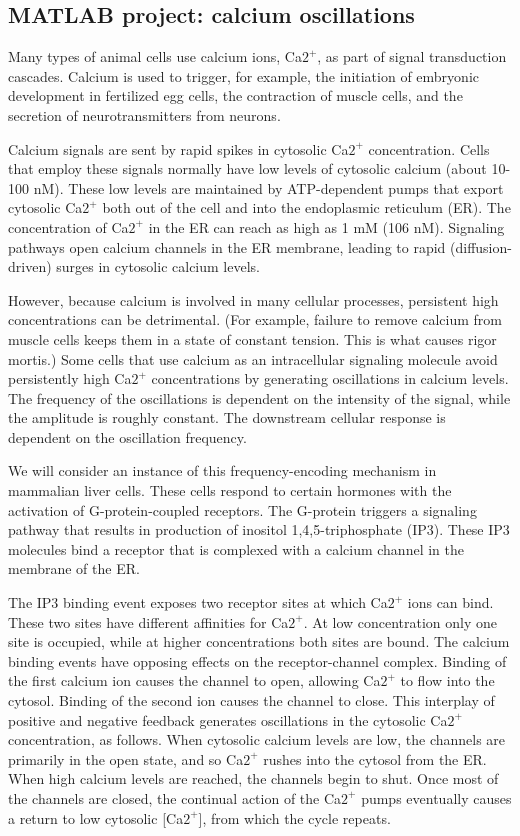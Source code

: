 \documentclass[12pt]{article}
\newcommand{\ans}[1]{

{\bf ANSWER:} #1\medskip}
\renewcommand{\ans}[1]{}
\begin{document}
\subsection*{MATLAB project: calcium oscillations}

\ans{VERSION WITH ANSWERS}

Many types of animal cells use calcium ions, Ca$2^+$, as part of signal
transduction cascades. Calcium is used to trigger, for example, the initiation
of embryonic development in fertilized egg cells, the contraction of muscle
cells, and the secretion of neurotransmitters from neurons.

Calcium signals are sent by rapid spikes in cytosolic Ca$2^+$ concentration.
Cells that employ these signals normally have low levels of cytosolic calcium
(about 10-100 nM). These low levels are maintained by ATP-dependent pumps that
export cytosolic Ca$2^+$ both out of the cell and into the endoplasmic
reticulum (ER). The concentration of Ca$2^+$ in the ER can reach as high as 1
mM (106 nM). Signaling pathways open calcium channels in the ER membrane,
leading to rapid (diffusion-driven) surges in cytosolic calcium levels.

However, because calcium is involved in many cellular processes, persistent
high concentrations can be detrimental. (For example, failure to remove
calcium from muscle cells keeps them in a state of constant tension.  This is
what causes rigor mortis.) Some cells that use calcium as an intracellular
signaling molecule avoid persistently high Ca$2^+$ concentrations by generating
oscillations in calcium levels. The frequency of the oscillations is dependent
on the intensity of the signal, while the amplitude is roughly constant. The
downstream cellular response is dependent on the oscillation frequency.

We will consider an instance of this frequency-encoding mechanism in mammalian
liver cells.  These cells respond to certain hormones with the activation of
G-protein-coupled receptors. The G-protein triggers a
signaling pathway that results in production of inositol 1,4,5-triphosphate
(IP3). These IP3 molecules bind a receptor that is complexed with a calcium
channel in the membrane of the ER.

The IP3 binding event exposes two receptor sites at which Ca$2^+$ ions can
bind.  These two sites have different affinities for Ca$2^+$.  At low 
concentration only one site is occupied, while at higher concentrations both
sites are bound. The calcium binding events have opposing effects on the
receptor-channel complex.  Binding of the first calcium ion causes the channel
to open, allowing Ca$2^+$ to flow into the cytosol.  Binding of the second ion
causes the channel to close. This interplay of positive and negative feedback
generates oscillations in the cytosolic Ca$2^+$ concentration, as follows. When
cytosolic calcium levels are low, the channels are primarily in the open
state, and so Ca$2^+$ rushes into the cytosol from the ER. When high calcium
levels are reached, the channels begin to shut. Once most of the channels are
closed, the continual action of the Ca$2^+$ pumps eventually causes a return to
low cytosolic [Ca$2^+$], from which the cycle repeats.
\end{document}
